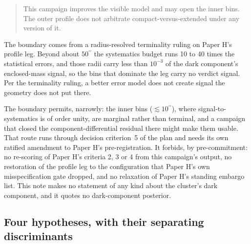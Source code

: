 \documentclass[11pt]{article}
\newcommand{\as}{\ensuremath{^{\prime\prime}}}
\begin{document}
\begin{quote}
This campaign improves the visible model and may open the inner bins. The outer profile does not arbitrate compact-versus-extended under any version of it.
\end{quote}

The boundary comes from a radius-resolved terminality ruling on Paper H's profile leg. Beyond about $50\as$ the systematics budget runs 10 to 40 times the statistical errors, and those radii carry less than $10^{-3}$ of the dark component's enclosed-mass signal, so the bins that dominate the leg carry no verdict signal. Per the terminality ruling, a better error model does not create signal the geometry does not put there.

The boundary permits, narrowly: the inner bins ($\lesssim 10\as$), where signal-to-systematics is of order unity, are marginal rather than terminal, and a campaign that closed the component-differential residual there might make them usable. That route runs through decision criterion~5 of the plan and needs its own ratified amendment to Paper H's pre-registration. It forbids, by pre-commitment: no re-scoring of Paper H's criteria 2, 3 or 4 from this campaign's output, no restoration of the profile leg to the configuration that Paper H's own misspecification gate dropped, and no relaxation of Paper H's standing embargo list. This note makes no statement of any kind about the cluster's dark component, and it quotes no dark-component posterior.

\subsection{Four hypotheses, with their separating discriminants}
\label{sec:hypotheses}
\end{document}
